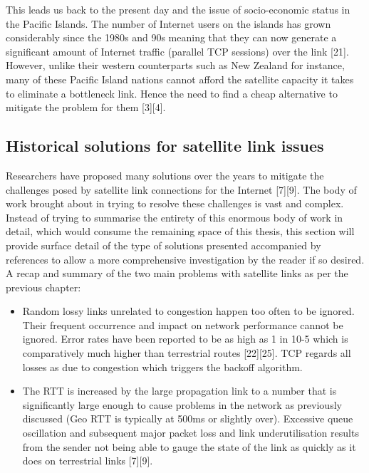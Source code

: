 \documentclass{uathesis}
\begin{document}
This leads us back to the present day and the issue of socio-economic status in the Pacific Islands. The number of Internet users on the islands has grown considerably since the 1980s and 90s meaning that they can now generate a significant amount of Internet traffic (parallel TCP sessions) over the link [21]. However, unlike their western counterparts such as New Zealand for instance, many of these Pacific Island nations cannot afford the satellite capacity it takes to eliminate a bottleneck link. Hence the need to find a cheap alternative to mitigate the problem for them [3][4]. 

\subsection{Historical solutions for satellite link issues}

Researchers have proposed many solutions over the years to mitigate the challenges posed by satellite link connections for the Internet [7][9]. The body of work brought about in trying to resolve these challenges is vast and complex. Instead of trying to summarise the entirety of this enormous body of work in detail, which would consume the remaining space of this thesis, this section will provide surface detail of the type of solutions presented accompanied by references to allow a more comprehensive investigation by the reader if so desired. \\

A recap and summary of the two main problems with satellite links as per the previous chapter:\\

\begin{itemize}

\item Random lossy links unrelated to congestion happen too often to be ignored. Their frequent occurrence and impact on network performance cannot be ignored. Error rates have been reported to be as high as 1 in 10-5 which is comparatively much higher than terrestrial routes [22][25]. TCP regards all losses as due to congestion which triggers the backoff algorithm.

\item The RTT is increased by the large propagation link to a number that is significantly large enough to cause problems in the network as previously discussed (Geo RTT is typically at 500ms or slightly over). Excessive queue oscillation and subsequent major packet loss and link underutilisation results from the sender not being able to gauge the state of the link as quickly as it does on terrestrial links [7][9].\\

\end{itemize}
\end{document}
